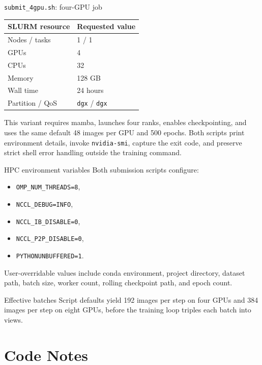 \documentclass[aspectratio=169,10pt]{beamer}
\newcommand{\file}[1]{\texttt{#1}}
\newcommand{\code}[1]{\texttt{#1}}
\begin{document}
\begin{frame}{\file{submit\_4gpu.sh}: four-GPU job}
  \centering
  \begin{tabular}{ll}
    \toprule
    SLURM resource & Requested value\\
    \midrule
    Nodes / tasks & 1 / 1\\
    GPUs & 4\\
    CPUs & 32\\
    Memory & 128 GB\\
    Wall time & 24 hours\\
    Partition / QoS & \code{dgx} / \code{dgx}\\
    \bottomrule
  \end{tabular}
  \vspace{0.7em}
  This variant requires mamba, launches four ranks, enables checkpointing, and
  uses the same default 48 images per GPU and 500 epochs. Both scripts print
  environment details, invoke \code{nvidia-smi}, capture the exit code, and
  preserve strict shell error handling outside the training command.
\end{frame}

\begin{frame}{HPC environment variables}
  Both submission scripts configure:
  \begin{itemize}
    \item \code{OMP\_NUM\_THREADS=8},
    \item \code{NCCL\_DEBUG=INFO},
    \item \code{NCCL\_IB\_DISABLE=0},
    \item \code{NCCL\_P2P\_DISABLE=0},
    \item \code{PYTHONUNBUFFERED=1}.
  \end{itemize}
  User-overridable values include conda environment, project directory, dataset
  path, batch size, worker count, rolling checkpoint path, and epoch count.
  \begin{block}{Effective batches}
    Script defaults yield 192 images per step on four GPUs and 384 images per
    step on eight GPUs, before the training loop triples each batch into views.
  \end{block}
\end{frame}

\section{Code Notes}
\end{document}
